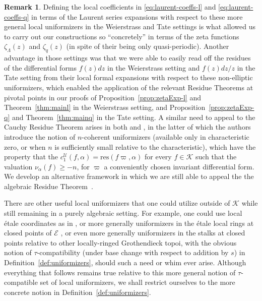 \documentclass[preprint,12pt]{elsarticle}
\numberwithin{equation}{section} %
\theoremstyle{theorem}
\theoremstyle{definition}
\newtheorem{remark}[theorem]{Remark}
\newcommand{\bk}{\mathcal{K}} %
\newcommand{\ec}{\mathcal{E}} %
\newcommand{\zl}{\zeta_{\Lambda}}
\newcommand{\zq}{\zeta_{q}}
\begin{document}
\begin{remark}
Defining the local coefficients in \eqref{eq:laurent-coeffs-l} and \eqref{eq:laurent-coeffs-q} in terms of the Laurent series expansions with respect to these more general local uniformizers in the Weierstrass and Tate settings is what allowed us to carry out our constructions so ``concretely'' in terms of the zeta functions $\zl(z)$ and $\zq(z)$ (in spite of their being only quasi-periodic). Another advantage in those settings was that we were able to easily read off the residues of the differential forms $f(z)dz$ in the Weierstrass setting and $f(z)dz/z$ in the Tate setting from their local formal expansions with respect to these non-elliptic uniformizers, which enabled the application of the relevant Residue Theorems at pivotal points in our proofs of Proposition~\ref{prop:zetaExp-l} and Theorem~\ref{thm:mainl} in the Weierstrass setting, and Proposition~\ref{prop:zetaExp-q} and Theorem~\ref{thm:mainq} in the Tate setting. A similar need to appeal to the Cauchy Residue Theorem arises in both \cite[Appendix~B]{Dreyfus2018} and \cite[Appendix~A]{Hardouin2021}, in the latter of which the authors introduce the notion of $n$-coherent uniformizers (available only in characteristic zero, or when $n$ is sufficiently small relative to the characteristic), which have the property that the $c_1^\mathcal{U}(f,\alpha)=\mathrm{res}(f\varpi,\alpha)$ for every $f\in\bk$ such that the valuation $\nu_\alpha(f)\geq -n$, for $\varpi$ a conveniently chosen invariant differential form. We develop an alternative framework in which we are still able to appeal the the algebraic Residue Theorem~\cite[Thm.~III.7.14.2]{Hartshorne}.

There are other useful local uniformizers that one could utilize outside of $\bk$ while still remaining in a purely algebraic setting. For example, one could use local \'etale coordinates as in \cite[\href{https://stacks.math.columbia.edu/tag/054L}{Lemma 054L}]{stacks-project}, or more generally uniformizers in the \'etale local rings at closed points of $\ec$ \cite[\href{https://stacks.math.columbia.edu/tag/0BSK}{Section 0BSK}]{stacks-project}, or even more generally uniformizers in the stalks at closed points relative to other locally-ringed Grothendieck topoi, with the obvious notion of $\tau$-compatibility (under base change with respect to addition by $s$) in Definition~\ref{def:uniformizers}, should such a need or whim ever arise. Although everything that follows remains true relative to this more general notion of $\tau$-compatible set of local uniformizers, we shall restrict ourselves to the more concrete notion in Definition~\ref{def:uniformizers}.
\end{remark}
\end{document}
